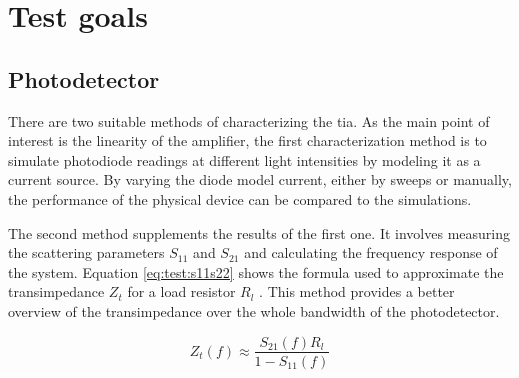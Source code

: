 


\section{Test goals}
\subsection{Photodetector}
There are two suitable methods of characterizing the \gls{tia}. As the main point of interest is the linearity of the amplifier, the first characterization method is to simulate photodiode readings at different light intensities by modeling it as a current source. By varying the diode model current, either by sweeps or manually, the performance of the physical device can be compared to the simulations.

The second method supplements the results of the first one. It involves measuring the scattering parameters $S_{11}$ and $S_{21}$ and calculating the frequency response of the system. Equation \eqref{eq:test:s11s22} shows the formula used to approximate the transimpedance $Z_t$ for a load resistor $R_l$ \cite{sackinger2017analysis}. This method provides a better overview of the transimpedance over the whole bandwidth of the photodetector.

\begin{equation}\label{eq:test:s11s22}
	Z_t(f) \approx \frac{S_{21}(f)R_l}{1 - S_{11}(f)}
\end{equation}

